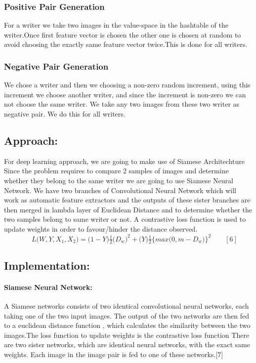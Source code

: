 \documentclass{article}
\begin{document}
    \subsubsection{Positive Pair Generation}
        For a writer we take two images in the value-space in the hashtable of the writer.Once first feature vector is chosen the other one is chosen at random to avoid choosing the exactly same feature vector twice.This is done for all writers.
    \subsubsection{Negative Pair Generation}
        We chose a writer and then we choosing a non-zero random increment, using this increment we choose another writer, and since the increment is non-zero we can not choose the same writer. We take any two images from these two writer as negative pair. We do this for all writers.
        
\subsection{Approach:}
For deep learning approach, we are going to make use of Siamese Architechture Since the problem requires to compare 2 samples of images and determine whether they belong to the same writer we are going to use Siamese Neural Network. We have two branches of  Convolutional Neural Network which will work as automatic feature extractors and the outputs of these sister branches are then merged in lambda layer of Euclidean Distance and to determine whether the two samples belong to same writer or not. A contrastive loss function is used to update weights in order to favour/hinder the distance observed.\\

\begin{math}
\qquad \qquad L\big(W,Y,X_1,X_2\big)=\big(1-Y\big)\frac{1}{2}\big(D_w\big)^2 + \big(Y\big)\frac{1}{2}\big\{max\big(0,m- D_w\big)\big\}^2    \qquad[6]
\end{math}

\subsection{Implementation:}
 
\paragraph{Siamese Neural Network:}
A Siamese networks consists of two identical convolutional neural networks, each taking one of the two input images. The output of the two networks are then fed to a euclidean distance function , which calculates the similarity between the two images.The loss function to update weights is the contrastive loss function
There are two sister networks, which are identical neural networks, with the exact same weights.
Each image in the image pair is fed to one of these networks.[7]
\end{document}
